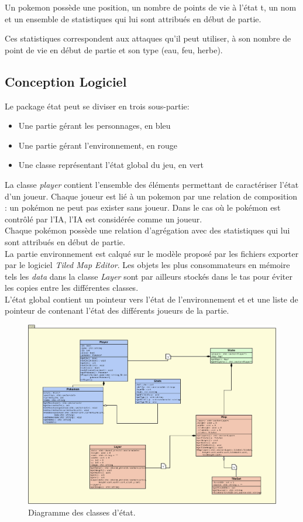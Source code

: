 \documentclass[a4paper,12pt]{article}
\begin{document}
    Un pokemon possède une position, un nombre de points de vie à l'état t, un nom et un ensemble de statistiques qui lui sont attribués en début de partie.

    Ces statistiques correspondent aux attaques qu'il peut utiliser, à son nombre de point de vie en début de partie et son type (eau, feu, herbe).
    \subsection{Conception Logiciel}
    Le package état peut se diviser en trois sous-partie:\begin{itemize}
        \item Une partie gérant les personnages, en bleu
        \item Une partie gérant l'environnement, en rouge
        \item Une classe représentant l'état global du jeu, en vert
    \end{itemize}

    La classe \emph{player} contient l'ensemble des éléments permettant de caractériser l'état d'un joueur. Chaque joueur est lié à un pokemon par une relation de composition : un pokémon ne peut pas exister sans joueur. Dans le cas où le pokémon est contrôlé par l'IA, l'IA est considérée comme un joueur.
    \\Chaque pokémon possède une relation d'agrégation avec des statistiques qui lui sont attribués en début de partie.
    \\La partie environnement est calqué sur le modèle proposé par les fichiers exporter par le logiciel \emph{Tiled Map Editor}. Les objets les plus consommateurs en mémoire tels les \emph{data} dans la classe \emph{Layer} sont par ailleurs stockés dans le tas pour éviter les copies entre les différentes classes.
    \\L'état global contient un pointeur vers l'état de l'environnement et et une liste de pointeur de contenant l'état des différents joueurs de la partie.
    \begin{landscape}
    \begin{figure}[p]
    \includegraphics[width=0.8\paperheight]{state.png}
    \caption{\label{uml:state}Diagramme des classes d'état.}
    \end{figure}
    \end{landscape}
    \clearpage
\end{document}

